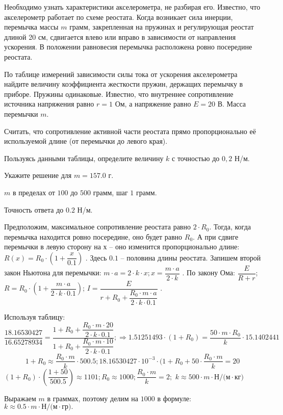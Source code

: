Необходимо узнать характеристики
акселерометра, не разбирая его. Известно, что акселерометр работает по схеме реостата. Когда возникает сила инерции,
перемычка массы $m$ грамм, закрепленная на пружинах и регулирующая реостат длиной
20 см, сдвигается влево или
вправо в зависимости от направления ускорения. В положении равновесия перемычка
расположена ровно посередине реостата.


По таблице измерений зависимости силы тока от
ускорения акселерометра найдите величину коэффициента жесткости пружин, держащих перемычку в приборе. Пружины
одинаковые. Известно, что
внутреннее сопротивление источника напряжения равно $r = 1$ Ом, а напряжение равно $E = 20$ В.  Масса
перемычки $m$.


Считать, что сопротивление активной части реостата прямо
пропорционально её используемой длине (от перемычки до левого края).

Пользуясь данными таблицы, определите величину $k$ с точностью до $0,2$ Н/м.

Укажите решение для $m=157.0$ г.

\paramSection

$m$ в пределах от $100$ до $500$ грамм, шаг $1$ грамм.  

Точность ответа  до  $0.2$  Н/м.

\solutionSection

Предположим, максимальное сопротивление реостата равно $2 \cdot R_0$. Тогда, когда перемычка находится 
ровно посередине, оно будет равно $R_0$. А при сдвиге перемычки в левую сторону на $х$ – оно изменится 
пропорционально длине: \linebreak $R(x)=R_0 \cdot (1+\dfrac{x}{0.1})$ . Здесь $0.1$ – половина длины реостата. 
Запишем второй закон Ньютона для перемычки:
$m \cdot a=2 \cdot k \cdot x;  x=\dfrac{m \cdot a}{2 \cdot k}$   . По закону Ома:   
$\dfrac{E}{R+r}$; $R=R_0 \cdot \left(1+\dfrac{m \cdot a}{2 \cdot k \cdot 0.1}\right)$; 
$I=  \dfrac{E}{r+R_0+\dfrac{R_0 \cdot m \cdot a}{2 \cdot k \cdot 0.1}}$ . 

Используя таблицу:
$$\dfrac{18.16530427}{16.65278934}=\dfrac{1+R_0+\dfrac{R_0 \cdot m \cdot 20}{2 \cdot k \cdot 0.1}}{1+R_0+\dfrac{R_0 \cdot m \cdot 10}{2 \cdot k \cdot 0.1}}; \Rightarrow  1.51251493 \cdot (1+R_0 )=\dfrac{50 \cdot m \cdot R_0}{k} \cdot 15.1402441$$
$$1+R_0 \approx   \dfrac{R_0 \cdot m}{k}   \cdot 500.5;  18.16530427 \cdot 10^{-3} \cdot (1+R_0+50 \cdot \dfrac{R_0 \cdot m}{k}=20$$
$(1+R_0 ) \cdot \left(\dfrac{1+50}{500.5}\right) \approx 1101;  R_0 \approx 1000;   \dfrac{R_0 \cdot m}{k}=2;$ 
$k \approx 500 \cdot m \cdot \text{Н/(м} \cdot \text{кг}) $  

Выражаем $m$ в граммах, поэтому делим на $1000$ в формуле:  $k \approx 0.5 \cdot m \cdot \text{Н/(м} \cdot \text{гр)}   .$

